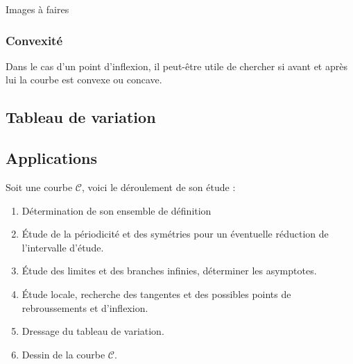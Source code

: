 Images à faires

\subsubsection{Convexité}
Dans le cas d'un point d'inflexion, il peut-être utile de chercher si avant et après lui la courbe est convexe ou concave.
\subsection{Tableau de variation}
\subsection{Applications}
\begin{meth}
Soit une courbe $\mathscr{C}$, voici le déroulement de son étude :
\begin{enumerate}
    \item Détermination de son ensemble de définition
    \item Étude de la périodicité et des symétries pour un éventuelle réduction de l'intervalle d'étude.
    \item Étude des limites et des branches infinies, déterminer les asymptotes.
    \item Étude locale, recherche des tangentes et des possibles points de rebroussements et d'inflexion.
    \item Dressage du tableau de variation.
    \item Dessin de la courbe $\mathscr{C}$.
\end{enumerate}
\end{meth}
